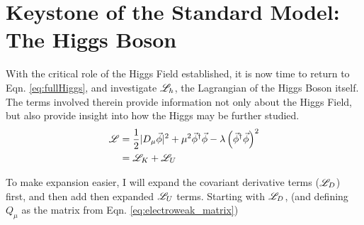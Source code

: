 \section{Keystone of the Standard Model: The Higgs Boson} \label{sec:higgs_boson}

    With the critical role of the Higgs Field established, it is now time to return to Eqn. \ref{eq:fullHiggs},
        and investigate $\mathscr{L}_h$, the Lagrangian of the Higgs Boson itself.
    The terms involved therein provide information not only about the Higgs Field,
        but also provide insight into how the Higgs may be further studied.
    \begin{equation} \begin{split}
        \mathscr{L} &= \frac{1}{2} |D_{\mu} \vec{\phi}|^2 +
            \mu^2 \vec{\phi}^\dag \vec{\phi} - \lambda \left( \vec{\phi}^\dag\vec{\phi} \right)^2
        \\&= \mathscr{L}_K + \mathscr{L}_U
    \end{split} \end{equation}
    
    To make expansion easier, I will expand the covariant derivative terms ($\mathscr{L}_D$) first,
        and then add then expanded $\mathscr{L}_U$ terms.
    Starting with $\mathscr{L}_D$, (and defining $Q_{\mu}$ as the matrix from Eqn. \ref{eq:electroweak_matrix})


